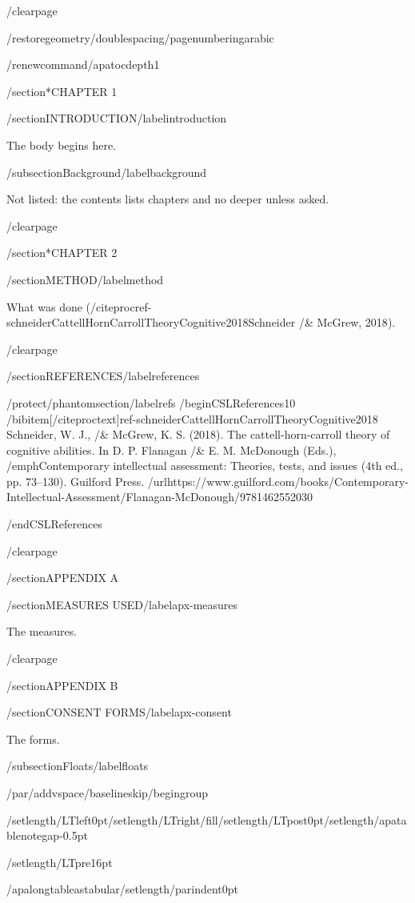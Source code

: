 /clearpage

/restoregeometry/doublespacing/pagenumbering{arabic}

/renewcommand{/apatocdepth}{1}

/section*{CHAPTER 1}

/section{INTRODUCTION}/label{introduction}

The body begins here.

/subsection{Background}/label{background}

Not listed: the contents lists chapters and no deeper unless asked.

/clearpage

/section*{CHAPTER 2}

/section{METHOD}/label{method}

What was done
(/citeproc{ref-schneiderCattellHornCarrollTheoryCognitive2018}{Schneider
/& McGrew, 2018}).

/clearpage

/section{REFERENCES}/label{references}

/protect/phantomsection/label{refs}
/begin{CSLReferences}{1}{0}
/bibitem[/citeproctext]{ref-schneiderCattellHornCarrollTheoryCognitive2018}
Schneider, W. J., /& McGrew, K. S. (2018). The cattell-horn-carroll
theory of cognitive abilities. In D. P. Flanagan /& E. M. McDonough
(Eds.), /emph{Contemporary intellectual assessment: Theories, tests, and
issues} (4th ed., pp. 73--130). Guilford Press.
/url{https://www.guilford.com/books/Contemporary-Intellectual-Assessment/Flanagan-McDonough/9781462552030}

/end{CSLReferences}

/clearpage

/section{APPENDIX A}

/section{MEASURES USED}/label{apx-measures}

The measures.

/clearpage

/section{APPENDIX B}

/section{CONSENT FORMS}/label{apx-consent}

The forms.

/subsection{Floats}/label{floats}

/par/addvspace{/baselineskip}/begingroup

/setlength{/LTleft}{0pt}/setlength{/LTright}{/fill}/setlength{/LTpost}{0pt}/setlength{/apatablenotegap}{-0.5pt}

/setlength{/LTpre}{16pt}

/apalongtableastabular/setlength{/parindent}{0pt}


